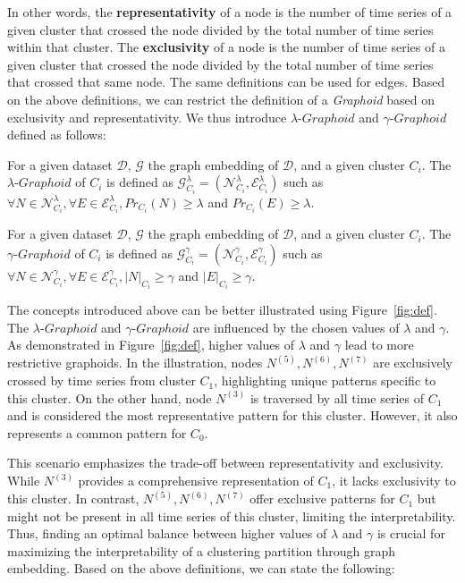In other words, the {\bf representativity} of a node is the number of time series of a given cluster that crossed the node divided by the total number of time series within that cluster. 
The {\bf exclusivity} of a node is the number of time series of a given cluster that crossed the node divided by the total number of time series that crossed that same node. The same definitions can be used for edges. 
Based on the above definitions, we can restrict the definition of a {\it Graphoid} based on exclusivity and representativity. 
We thus introduce $\lambda$-$Graphoid$ and $\gamma$-$Graphoid$ defined as follows:

\begin{definition}   
For a given dataset $\mathcal{D}$, $\mathcal{G}$ the graph embedding of $\mathcal{D}$, and a given cluster $C_i$. The $\lambda$-$Graphoid$ of $C_i$ is defined as $\mathcal{G}^{\lambda}_{C_i} = (\mathcal{N}^{\lambda}_{C_i},\mathcal{E}^{\lambda}_{C_i})$ such as $\forall N \in \mathcal{N}^{\lambda}_{C_i}, \forall E \in \mathcal{E}^{\lambda}_{C_i}, Pr_{C_i}(N) \geq \lambda$ and $Pr_{C_i}(E) \geq \lambda$.
\label{deflambdaGraph}  
\end{definition}

\begin{definition}   
For a given dataset $\mathcal{D}$, $\mathcal{G}$ the graph embedding of $\mathcal{D}$, and a given cluster $C_i$. The $\gamma$-$Graphoid$ of $C_i$ is defined as $\mathcal{G}^{\gamma}_{C_i} = (\mathcal{N}^{\gamma}_{C_i},\mathcal{E}^{\gamma}_{C_i})$ such as $\forall N \in \mathcal{N}^{\gamma}_{C_i}, \forall E \in \mathcal{E}^{\gamma}_{C_i}, |N|_{C_i} \geq \gamma$ and $|E|_{C_i} \geq \gamma$.
\label{defgammaGraph}  
\end{definition}

The concepts introduced above can be better illustrated using Figure~\ref{fig:def}. The $\lambda$-$Graphoid$ and $\gamma$-$Graphoid$ are influenced by the chosen values of $\lambda$ and $\gamma$. As demonstrated in Figure~\ref{fig:def}, higher values of $\lambda$ and $\gamma$ lead to more restrictive graphoids. In the illustration, nodes $N^{(5)},N^{(6)},N^{(7)}$ are exclusively crossed by time series from cluster $C_1$, highlighting unique patterns specific to this cluster. On the other hand, node $N^{(3)}$ is traversed by all time series of $C_1$ and is considered the most representative pattern for this cluster. However, it also represents a common pattern for $C_0$.

This scenario emphasizes the trade-off between representativity and exclusivity. While $N^{(3)}$ provides a comprehensive representation of $C_1$, it lacks exclusivity to this cluster. In contrast, $N^{(5)}, N^{(6)}, N^{(7)}$ offer exclusive patterns for $C_1$ but might not be present in all time series of this cluster, limiting the interpretability. Thus, finding an optimal balance between higher values of $\lambda$ and $\gamma$ is crucial for maximizing the interpretability of a clustering partition through graph embedding.
Based on the above definitions, we can state the following:

